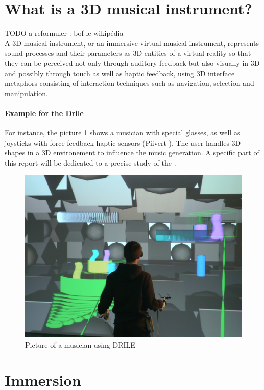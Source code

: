 \newpage
\section{What is a 3D musical instrument?}
{\LARGE{TODO a reformuler : bof le wikipédia}}\\
A 3D musical instrument, or an immersive virtual musical instrument, represents sound processes and their parameters as 3D entities of a virtual reality so that they can be perceived not only through auditory feedback but also visually in 3D and possibly through touch as well as haptic feedback, using 3D interface metaphors consisting of interaction techniques such as navigation, selection and manipulation.

\paragraph{Example for the Drile}
For instance, the picture \ref{fig:drile} shows a musician with special glasses, as well as joysticks with force-feedback haptic sensors (Piivert \cite{berthaut2010piivert}). 
The user handles 3D shapes in a 3D environement to influence the music generation. A specific part of this report will be dedicated to a precise study of the .

\begin{figure}[t]
\centering
\includegraphics[scale=0.3]{image/drile.jpg}
\caption{Picture of a musician using DRILE}
\label{fig:drile}
\end{figure}

\newpage
\section{Immersion}
